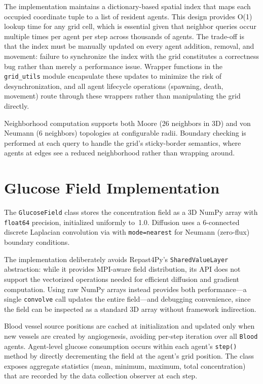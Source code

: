 The implementation maintains a dictionary-based spatial index that maps each occupied coordinate tuple to a list of resident agents.  This design provides O(1) lookup time for any grid cell, which is essential given that neighbor queries occur multiple times per agent per step across thousands of agents.  The trade-off is that the index must be manually updated on every agent addition, removal, and movement: failure to synchronize the index with the grid constitutes a correctness bug rather than merely a performance issue.  Wrapper functions in the \texttt{grid\_utils} module encapsulate these updates to minimize the risk of desynchronization, and all agent lifecycle operations (spawning, death, movement) route through these wrappers rather than manipulating the grid directly.

Neighborhood computation supports both Moore (26 neighbors in 3D) and von Neumann (6 neighbors) topologies at configurable radii.  Boundary checking is performed at each query to handle the grid's sticky-border semantics, where agents at edges see a reduced neighborhood rather than wrapping around.

\section{Glucose Field Implementation}
\label{sec:glucose-field-impl}

The \texttt{GlucoseField} class stores the concentration field as a 3D NumPy array with \texttt{float64} precision, initialized uniformly to~1.0.  Diffusion uses a 6-connected discrete Laplacian convolution via  with \texttt{mode=\textquotesingle nearest\textquotesingle} for Neumann (zero-flux) boundary conditions.

The implementation deliberately avoids Repast4Py's \texttt{Shared\-Value\-Layer} abstraction: while it provides MPI-aware field distribution, its API does not support the vectorized operations needed for efficient diffusion and gradient computation.  Using raw NumPy arrays instead provides both performance---a single \texttt{convolve} call updates the entire field---and debugging convenience, since the field can be inspected as a standard 3D array without framework indirection.

Blood vessel source positions are cached at initialization and updated only when new vessels are created by angiogenesis, avoiding per-step iteration over all \texttt{Blood} agents.  Agent-level glucose consumption occurs within each agent's \texttt{step()} method by directly decrementing the field at the agent's grid position.  The class exposes aggregate statistics (mean, minimum, maximum, total concentration) that are recorded by the data collection observer at each step.

